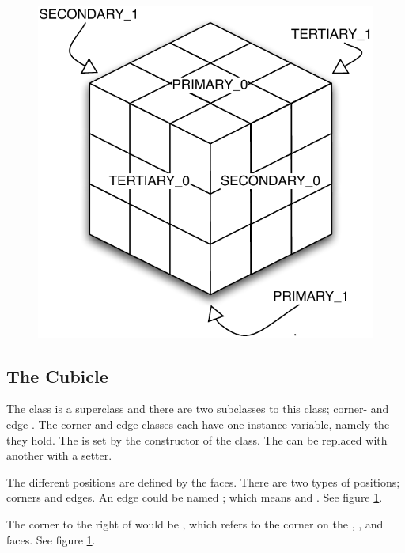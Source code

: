 \begin{figure}[htbp]
	\centering
		\includegraphics[scale=0.5]{input/pics/faceRanking.pdf}
	\caption{}
	\label{fig:faceRanking}
\end{figure}

\subsection{The Cubicle}
The \cubicle{} class is a superclass and there are two subclasses to this class; corner- and edge \cubicle{}.
The corner and edge \cubicle{} classes each have one instance variable, namely the \cubie{} they hold. The \cpiece{} is set by the constructor of the \cubicle{} class. 
The \cubie{} can be replaced with another \cubie{} with a setter. 

The different positions are defined by the faces. There are two types of positions; corners and edges.
An edge \cubicle{} could be named ; which means  and .  See figure \ref{fig:faceRanking}.

The corner to the right of  would be , which refers to the corner on the , , and  faces. See figure \ref{fig:faceRanking}.


